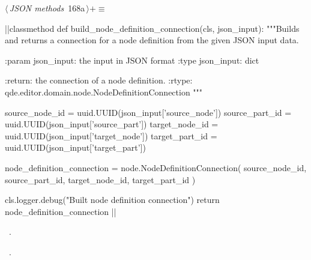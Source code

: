 \documentclass[%
    a4paper,    %
    justified,  %
    nobib,      %
    openany     %
]{tufte-book}
\begin{document}
\begin{flushleft} \small
\begin{minipage}{\linewidth}\label{scrap197}\raggedright\small
{} $\langle\,${\itshape JSON methods}\nobreak\ {\footnotesize {168a}}$\,\rangle+\equiv$
\vspace{-1ex}
\begin{pythoncode}
|\normalfont{}\fontfamily{}|classmethod
def build_node_definition_connection(cls, json_input):
    """Builds and returns a connection for a node definition from the given
    JSON input data.

    :param json_input: the input in JSON format
    :type  json_input: dict

    :return: the connection of a node definition.
    :rtype:  qde.editor.domain.node.NodeDefinitionConnection
    """

    source_node_id = uuid.UUID(json_input['source_node'])
    source_part_id = uuid.UUID(json_input['source_part'])
    target_node_id = uuid.UUID(json_input['target_node'])
    target_part_id = uuid.UUID(json_input['target_part'])

    node_definition_connection = node.NodeDefinitionConnection(
        source_node_id,
        source_part_id,
        target_node_id,
        target_part_id
    )

    cls.logger.debug("Built node definition connection")
    return node_definition_connection
|\NWsep|
\end{pythoncode}
\vspace{1.5ex}
\footnotesize
\begin{list}{}{\setlength{\itemsep}{-\parsep}\setlength{\itemindent}{-\leftmargin}}
\item \NWtxtMacroDefBy\ .
\item \NWtxtMacroRefIn\ .

\item{}
\end{list}
\end{minipage}\vspace{4ex}
\end{flushleft}
\end{document}
